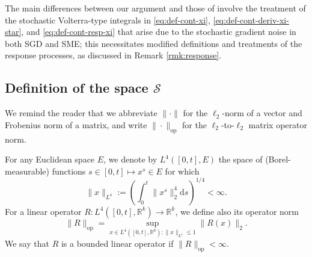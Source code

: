 \documentclass[11pt,letterpaper,reqno]{amsart}
\theoremstyle{definition}
\def\d{\mathrm{d}}
\def\R{\mathbb{R}}
\def\cS{\mathcal{S}}
\newcommand{\norm}[1]{\|#1\|}
\newcommand{\normop}[1]{\|#1\|_{\mathrm{op}}}
\begin{document}
The main differences between our argument and those of \cite{celentano2021high} involve the
treatment of the stochastic Volterra-type integrals in \eqref{eq:def-cont-xi},
\eqref{eq:def-cont-deriv-xi-star}, and \eqref{eq:def-cont-resp-xi} that arise
due to the stochastic gradient noise in both SGD and SME; this necessitates 
modified definitions and treatments of the response processes, as discussed in
Remark \ref{rmk:response}.

\subsection{Definition of the space $\cS$}

We remind the reader that we abbreviate $\norm{\cdot}$ for the $\ell_2$-norm of
a vector and Frobenius norm of a matrix, and write $\normop{\cdot}$ for the
$\ell_2$-to-$\ell_2$ matrix operator norm.

For any Euclidean space $E$, we denote by
$L^4([0,t],E)$ the space of (Borel-measurable) functions
$s \in [0,t] \mapsto x^s \in E$ for which
\[\|x\|_{L^4}:=\left(\int_0^t \|x^s\|_2^4 \d s\right)^{1/4}<\infty.\]
For a linear operator $R:L^4([0,t],\R^k) \to \R^k$, we define also
its operator norm
\[\normop{R}=\sup_{x \in L^4([0,t],\R^k):\|x\|_{L^4} \leq 1} \norm{R(x)}_2.\]
We say that $R$ is a bounded linear operator if $\normop{R}<\infty$.
\end{document}
